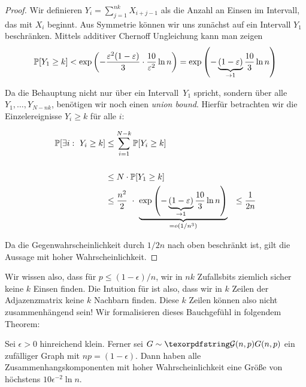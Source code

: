 \begin{proof}
    Wir definieren $Y_i = \sum_{j=1}^{nk} X_{i+j-1}$ als die Anzahl an Einsen im Intervall, das mit $X_i$ beginnt.
    Aus Symmetrie können wir uns zunächst auf ein Intervall $Y_1$ beschränken.
    Mittels additiver Chernoff Ungleichung kann man zeigen
    \begin{align}
        \mathbb{P}\!\left[Y_1 \ge k\right] < \exp\left(-\frac{\varepsilon^2(1-\varepsilon)}{3} \cdot \frac{10}{\varepsilon^2} \ln n \right)
        = \exp\left(- \underbrace{(1-\varepsilon)}_{\to 1} \frac{10}{3} \ln n \right)
    \end{align}

    Da die Behauptung nicht nur über ein Intervall~$Y_1$ spricht, sondern über alle $Y_1, \ldots, Y_{N-nk}$, benötigen wir noch einen \emph{union bound}.
    Hierfür betrachten wir die Einzelereignisse $Y_i \ge k$ für alle $i$:

    \begin{align}
        \prob{\exists i:\ Y_i \ge k} & \le \sum_{i=1}^{N-k} \prob{Y_i \ge k}                                                                                        \\                                                                      \\
                                     & \le N \cdot \prob{Y_1 \ge k}                                                                                                 \\
                                     & \le \frac{n^2}{2} \ \cdot\ \underbrace{\exp\left(- \underbrace{(1-\epsilon)}_{\to 1} \frac{10}{3} \ln n \right)}_{=o(1/n^3)}
                                     & \le \frac{1}{2n}
    \end{align}

    Da die Gegenwahrscheinlichkeit durch $1/2n$ nach oben beschränkt ist, gilt die Aussage mit hoher Wahrscheinlichkeit.
\end{proof}

Wir wissen also, dass für $p \le (1 - \epsilon) / n$, wir in $nk$ Zufallsbits ziemlich sicher keine $k$ Einsen finden.
Die Intuition für \Gnp ist also, dass wir in $k$ Zeilen der Adjazenzmatrix keine $k$ Nachbarn finden.
Diese $k$ Zeilen können also nicht zusammenhängend sein!
Wir formalisieren dieses Bauchgefühl in folgendem Theorem:

\begin{theorem}
    Sei  $\epsilon > 0$ hinreichend klein.
    Ferner sei $G \sim \Gnp$ ein zufälliger Graph mit $np = (1 - \epsilon)$.
    Dann haben alle Zusammenhangskomponenten mit hoher Wahrscheinlichkeit eine Größe von höchstens $10 \epsilon^{-2} \ln n$.
\end{theorem}

